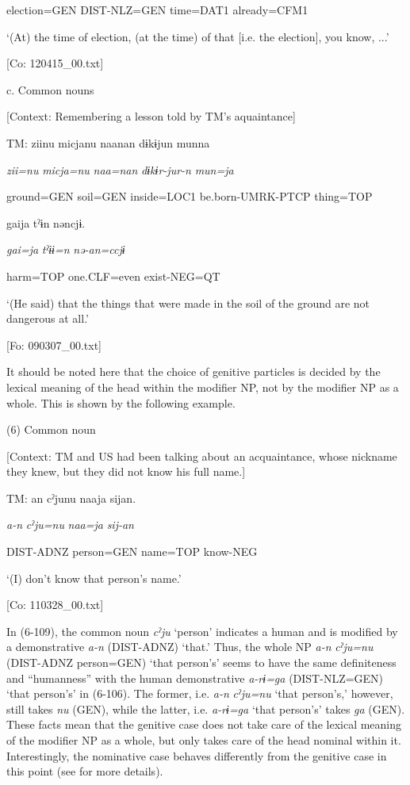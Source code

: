       election=GEN  DIST-NLZ=GEN  time=DAT1  already=CFM1

      ‘(At) the time of election, (at the time) of that [i.e. the election], you know, ...’

      [Co: 120415\_00.txt]

  c.  Common nouns

    [Context: Remembering a lesson told by TM’s aquaintance]

    TM:  ziinu  micjanu  naanan  dɨkɨjun  munna

      \textit{zii=nu}  \textit{micja=nu}  \textit{naa=nan}  \textit{dɨkɨr-jur-n}  \textit{mun=ja}

      ground=GEN  soil=GEN  inside=LOC1  be.born-UMRK-PTCP  thing=TOP

      gaija  tˀɨn  nəncjɨ.

      \textit{gai=ja}  \textit{tˀɨɨ=n}  \textit{nə-an=ccjɨ}

      harm=TOP  one.CLF=even  exist-NEG=QT

      ‘(He said) that the things that were made in the soil of the ground are not dangerous at all.’

      [Fo: 090307\_00.txt]

It should be noted here that the choice of genitive particles is decided by the lexical meaning of the head within the modifier NP, not by the modifier NP as a whole. This is shown by the following example.

(6)  Common noun

  [Context: TM and US had been talking about an acquaintance, whose nickname they knew, but they did not know his full name.]

  TM:  an  cˀjunu  naaja  sijan.

    \textit{a-n}  \textit{cˀju=nu}  \textit{naa=ja}  \textit{sij-an}

    DIST-ADNZ  person=GEN  name=TOP  know-NEG

    ‘(I) don’t know that person’s name.’

    [Co: 110328\_00.txt]

In (6-109), the common noun \textit{cˀju} ‘person’ indicates a human and is modified by a demonstrative \textit{a-n} (DIST-ADNZ) ‘that.’ Thus, the whole NP \textit{a-n} \textit{cˀju=nu} (DIST-ADNZ person=GEN) ‘that person’s’ seems to have the same definiteness and “humanness” with the human demonstrative \textit{a-rɨ=ga} (DIST-NLZ=GEN) ‘that person’s’ in (6-106). The former, i.e. \textit{a-n} \textit{cˀju=nu} ‘that person’s,’ however, still takes \textit{nu} (GEN), while the latter, i.e. \textit{a-rɨ=ga} ‘that person’s’ takes \textit{ga} (GEN). These facts mean that the genitive case does not take care of the lexical meaning of the modifier NP as a whole, but only takes care of the head nominal within it. Interestingly, the nominative case behaves differently from the genitive case in this point (see  for more details).

